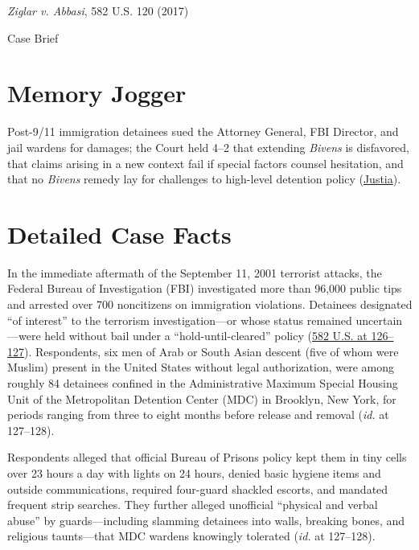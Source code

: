 \documentclass[12pt]{article}
\begin{document}
\begin{center}
{\LARGE \textit{Ziglar v. Abbasi}, 582 U.S. 120 (2017)\par}
\vspace{0.8em}
{\large Case Brief\par}
\end{center}
\vspace{1em}

\section{Memory Jogger}
Post-9/11 immigration detainees sued the Attorney General, FBI Director, and jail wardens for damages; the Court held 4--2 that extending \textit{Bivens} is disfavored, that claims arising in a new context fail if special factors counsel hesitation, and that no \textit{Bivens} remedy lay for challenges to high-level detention policy (\href{https://supreme.justia.com/cases/federal/us/582/15-1358/}{Justia}).

\section{Detailed Case Facts}
In the immediate aftermath of the September 11, 2001 terrorist attacks, the Federal Bureau of Investigation (FBI) investigated more than 96,000 public tips and arrested over 700 noncitizens on immigration violations. Detainees designated ``of interest'' to the terrorism investigation---or whose status remained uncertain---were held without bail under a ``hold-until-cleared'' policy (\href{https://www.law.cornell.edu/supremecourt/text/15-1358}{582 U.S. at 126--127}). Respondents, six men of Arab or South Asian descent (five of whom were Muslim) present in the United States without legal authorization, were among roughly 84 detainees confined in the Administrative Maximum Special Housing Unit of the Metropolitan Detention Center (MDC) in Brooklyn, New York, for periods ranging from three to eight months before release and removal (\textit{id.} at 127--128).

Respondents alleged that official Bureau of Prisons policy kept them in tiny cells over 23 hours a day with lights on 24 hours, denied basic hygiene items and outside communications, required four-guard shackled escorts, and mandated frequent strip searches. They further alleged unofficial ``physical and verbal abuse'' by guards---including slamming detainees into walls, breaking bones, and religious taunts---that MDC wardens knowingly tolerated (\textit{id.} at 127--128).
\end{document}
